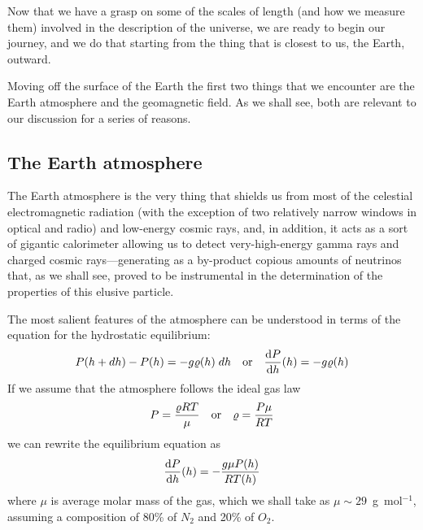 
Now that we have a grasp on some of the scales of length (and how we measure them)
involved in the description of the universe, we are ready to begin our journey, and
we do that starting from the thing that is closest to us, the Earth, outward.

Moving off the surface of the Earth the first two things that we encounter are the
Earth atmosphere and the geomagnetic field. As we shall see, both are relevant to
our discussion for a series of reasons.



\subsection{The Earth atmosphere}
\label{sec:earth_atmosphere}

The Earth atmosphere is the very thing that shields us from most of the celestial
electromagnetic radiation (with the exception of two relatively narrow windows in
optical and radio) and low-energy cosmic rays, and, in addition, it acts as a sort
of gigantic calorimeter allowing us to detect very-high-energy gamma rays and charged
cosmic rays---generating as a by-product copious amounts of neutrinos that, as we
shall see, proved to be instrumental in the determination of the properties of this
elusive particle.

The most salient features of the atmosphere can be understood in terms of the equation
for the hydrostatic equilibrium:
\begin{align*}
  P(h + dh) - P(h) = -g\varrho(h) \;d{h}
  \quad\text{or}\quad
  \dv{\ensuremath{P}}{h}{(h)} = -g\varrho(h)
\end{align*}
If we assume that the atmosphere follows the ideal gas law
\begin{align*}
  P = \frac{\varrho RT}{\mu}
  \quad\text{or}\quad
  \varrho = \frac{P \mu}{RT}
\end{align*}
we can rewrite the equilibrium equation as
\begin{align}\label{eq:atmosphere_hydrostatic_equilibrium}
  \dv{\ensuremath{P}}{h}{(h)} = - \frac{g\mu P(h)}{RT(h)}
\end{align}
where $\mu$ is average molar mass of the gas, which we shall take as
$\mu \sim 29$~g~mol$^{-1}$, assuming a composition of 80\% of $N_2$ and 20\% of $O_2$.

